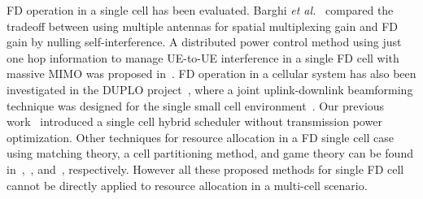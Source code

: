 \documentclass[journal]{IEEEtran}
\begin{document}
FD operation in a single cell has been evaluated\cite{Barghi12,SanjayICC14,DiINFOCOM,Shaocommletter,GMSingleCell,ouyang2015leveraging,Nguyenduplo}. Barghi \emph{et al.}~\cite{Barghi12} compared the tradeoff between using multiple antennas for spatial multiplexing gain and FD gain by nulling self-interference.  A distributed power control method using just one hop information to manage UE-to-UE interference in a single FD cell with massive MIMO was proposed in~\cite{ouyang2015leveraging}. FD operation in a cellular system has also been investigated in the DUPLO project~\cite{duplo_site}, where a joint uplink-downlink beamforming technique was designed for the single small cell environment~\cite{Nguyenduplo}. Our previous work~\cite{SanjayICC14} introduced a single cell hybrid scheduler without transmission power optimization. Other techniques for resource allocation in a FD single cell case using matching theory, a cell partitioning method, and game theory can be found in~\cite{DiINFOCOM},~\cite{Shaocommletter}, and~\cite{GMSingleCell}, respectively. However all these proposed methods for single FD cell cannot be directly applied to resource allocation in a multi-cell scenario. 
\end{document}
